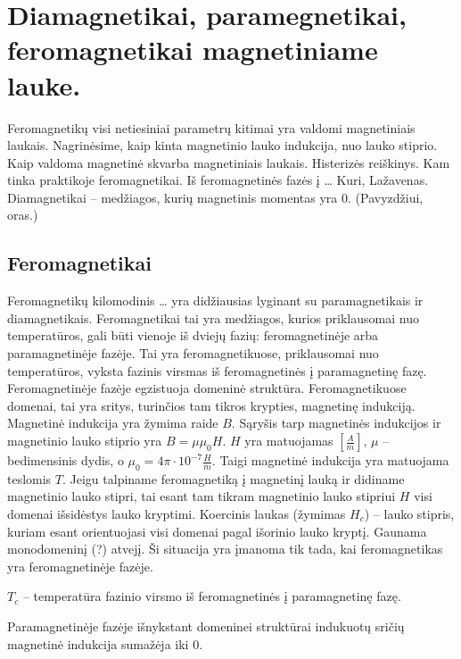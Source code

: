\section{Diamagnetikai, paramegnetikai, feromagnetikai magnetiniame lauke.}
Feromagnetikų visi netiesiniai parametrų kitimai yra valdomi magnetiniais
laukais. Nagrinėsime, kaip kinta magnetinio lauko indukcija, nuo
lauko stiprio. Kaip valdoma magnetinė skvarba magnetiniais laukais.
Histerizės reiškinys. Kam tinka praktikoje feromagnetikai. Iš
feromagnetinės fazės į … Kuri, Lažavenas. Diamagnetikai – medžiagos, kurių
magnetinis momentas yra 0. (Pavyzdžiui, oras.)


\subsection{Feromagnetikai}

Feromagnetikų kilomodinis … yra didžiausias lyginant su
paramagnetikais ir diamagnetikais. Feromagnetikai tai yra medžiagos,
kurios priklausomai nuo temperatūros, gali būti vienoje iš dviejų
fazių: feromagnetinėje arba paramagnetinėje fazėje. Tai yra
feromagnetikuose, priklausomai nuo temperatūros, vyksta fazinis virsmas
iš feromagnetinės į paramagnetinę fazę. Feromagnetinėje fazėje
egzistuoja domeninė struktūra. Feromagnetikuose domenai, tai yra
sritys, turinčios tam tikros krypties, magnetinę indukciją.
Magnetinė indukcija yra žymima raide $B$. Sąryšis tarp magnetinės
indukcijos ir magnetinio lauko stiprio yra $B = \mu\mu_{0}H$.
$H$ yra matuojamas $\left[ \frac{A}{m} \right]$, $\mu$ – bedimensinis
dydis, o $\mu_{0} = 4 \pi \cdot 10 ^{-7}\frac{H}{m}$. Taigi
magnetinė indukcija yra matuojama teslomis $T$. Jeigu talpiname
feromagnetiką į magnetinį lauką ir didiname magnetinio lauko stipri,
tai esant tam tikram magnetinio lauko stipriui $H$ visi domenai išsidėstys
lauko kryptimi. Koercinis laukas (žymimas $H_{c}$) – lauko stipris,
kuriam esant orientuojasi visi domenai pagal išorinio lauko kryptį.
Gaunama monodomeninį (?) atvejį. Ši situacija yra įmanoma tik tada,
kai feromagnetikas yra feromagnetinėje fazėje.

$T_{c}$ – temperatūra fazinio virsmo iš feromagnetinės į paramagnetinę
fazę.

Paramagnetinėje fazėje išnykstant domeninei struktūrai indukuotų
sričių magnetinė indukcija sumažėja iki 0.

